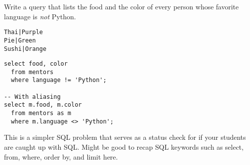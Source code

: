 \begin{blocksection}
\question Write a query that lists the food and the color of every person whose
favorite language is \emph{not} Python.

\begin{lstlisting}
Thai|Purple
Pie|Green
Sushi|Orange
\end{lstlisting}

\begin{solution}[1in]
\begin{lstlisting}
select food, color
  from mentors
  where language != 'Python';
  
-- With aliasing
select m.food, m.color
  from mentors as m
  where m.language <> 'Python';
\end{lstlisting}
\end{solution}
\end{blocksection}

\begin{guide}
This is a simpler SQL problem that serves as a status check for if your students are caught up with SQL. Might be good to recap SQL keywords such as select, from, where, order by, and limit here.
\end{guide}